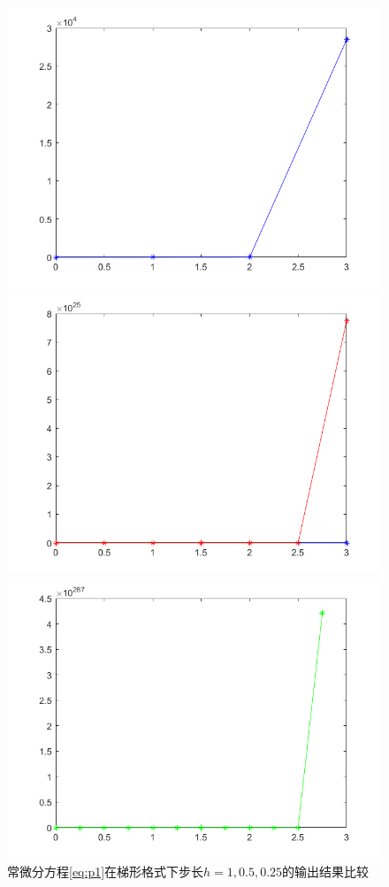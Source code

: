 \documentclass[UTF8]{ctexart}
\begin{document}
\begin{figure}[H]
	\centering
	\begin{minipage}[c]{0.5\textwidth}
		\centering
		\includegraphics[width=0.7\columnwidth]{figures/p1heun1.png}
	\end{minipage}%
	\begin{minipage}[c]{0.5\textwidth}
		\centering
		\includegraphics[width=0.7\columnwidth]{figures/p1heun2.png}
	\end{minipage}
	\begin{minipage}[c]{0.5\textwidth}
		\centering
		\includegraphics[width=0.7\columnwidth]{figures/p1heun3.png}
	\end{minipage}
	\caption{常微分方程\ref{eq:p1}在梯形格式下步长$h=1, 0.5, 0.25$的输出结果比较}
\end{figure}
\end{document}
